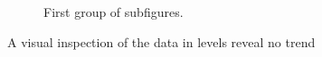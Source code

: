 \begin{figure}[!ht]
  \caption{First group of subfigures.}
  \label{fig:sub1}
\end{figure}
A visual inspection of the data in levels reveal no trend